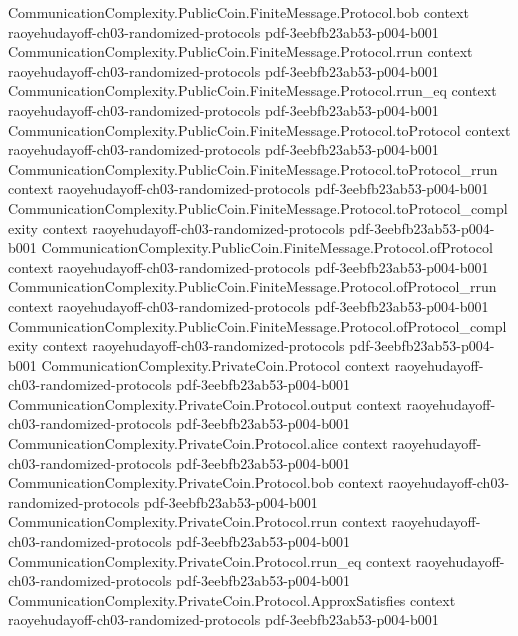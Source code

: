 \begin{theorem}
\proofstep
  {CommunicationComplexity.PublicCoin.FiniteMessage.Protocol.bob}
  {context}
  {raoyehudayoff-ch03-randomized-protocols}
  {pdf-3eebfb23ab53-p004-b001}
\proofstep
  {CommunicationComplexity.PublicCoin.FiniteMessage.Protocol.rrun}
  {context}
  {raoyehudayoff-ch03-randomized-protocols}
  {pdf-3eebfb23ab53-p004-b001}
\proofstep
  {CommunicationComplexity.PublicCoin.FiniteMessage.Protocol.rrun_eq}
  {context}
  {raoyehudayoff-ch03-randomized-protocols}
  {pdf-3eebfb23ab53-p004-b001}
\proofstep
  {CommunicationComplexity.PublicCoin.FiniteMessage.Protocol.toProtocol}
  {context}
  {raoyehudayoff-ch03-randomized-protocols}
  {pdf-3eebfb23ab53-p004-b001}
\proofstep
  {CommunicationComplexity.PublicCoin.FiniteMessage.Protocol.toProtocol_rrun}
  {context}
  {raoyehudayoff-ch03-randomized-protocols}
  {pdf-3eebfb23ab53-p004-b001}
\proofstep
  {CommunicationComplexity.PublicCoin.FiniteMessage.Protocol.toProtocol_complexity}
  {context}
  {raoyehudayoff-ch03-randomized-protocols}
  {pdf-3eebfb23ab53-p004-b001}
\proofstep
  {CommunicationComplexity.PublicCoin.FiniteMessage.Protocol.ofProtocol}
  {context}
  {raoyehudayoff-ch03-randomized-protocols}
  {pdf-3eebfb23ab53-p004-b001}
\proofstep
  {CommunicationComplexity.PublicCoin.FiniteMessage.Protocol.ofProtocol_rrun}
  {context}
  {raoyehudayoff-ch03-randomized-protocols}
  {pdf-3eebfb23ab53-p004-b001}
\proofstep
  {CommunicationComplexity.PublicCoin.FiniteMessage.Protocol.ofProtocol_complexity}
  {context}
  {raoyehudayoff-ch03-randomized-protocols}
  {pdf-3eebfb23ab53-p004-b001}
\proofstep
  {CommunicationComplexity.PrivateCoin.Protocol}
  {context}
  {raoyehudayoff-ch03-randomized-protocols}
  {pdf-3eebfb23ab53-p004-b001}
\proofstep
  {CommunicationComplexity.PrivateCoin.Protocol.output}
  {context}
  {raoyehudayoff-ch03-randomized-protocols}
  {pdf-3eebfb23ab53-p004-b001}
\proofstep
  {CommunicationComplexity.PrivateCoin.Protocol.alice}
  {context}
  {raoyehudayoff-ch03-randomized-protocols}
  {pdf-3eebfb23ab53-p004-b001}
\proofstep
  {CommunicationComplexity.PrivateCoin.Protocol.bob}
  {context}
  {raoyehudayoff-ch03-randomized-protocols}
  {pdf-3eebfb23ab53-p004-b001}
\proofstep
  {CommunicationComplexity.PrivateCoin.Protocol.rrun}
  {context}
  {raoyehudayoff-ch03-randomized-protocols}
  {pdf-3eebfb23ab53-p004-b001}
\proofstep
  {CommunicationComplexity.PrivateCoin.Protocol.rrun_eq}
  {context}
  {raoyehudayoff-ch03-randomized-protocols}
  {pdf-3eebfb23ab53-p004-b001}
\proofstep
  {CommunicationComplexity.PrivateCoin.Protocol.ApproxSatisfies}
  {context}
  {raoyehudayoff-ch03-randomized-protocols}
  {pdf-3eebfb23ab53-p004-b001}

\end{theorem}
